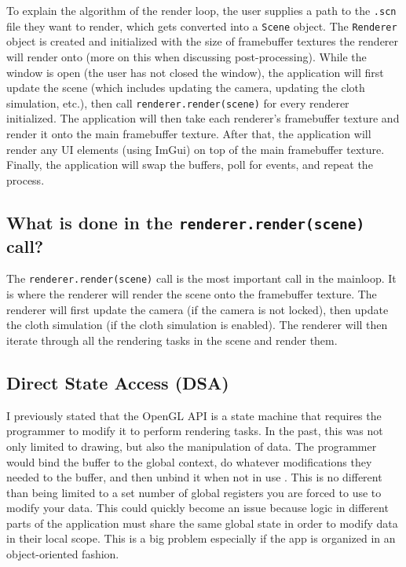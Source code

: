 \documentclass[letterpaper, 10 pt, conference]{ieeeconf}  %
\begin{document}
To explain the algorithm of the render loop, the user supplies a path to the \texttt{.scn} file they want to render, which gets converted into a \texttt{Scene} object. The \texttt{Renderer} object is created and initialized with the size of framebuffer textures the renderer will render onto (more on this when discussing post-processing). While the window is open (the user has not closed the window), the application will first update the scene (which includes updating the camera, updating the cloth simulation, etc.), then call \texttt{renderer.render(scene)} for every renderer initialized. The application will then take each renderer's framebuffer texture and render it onto the main framebuffer texture. After that, the application will render any UI elements (using ImGui) on top of the main framebuffer texture. Finally, the application will swap the buffers, poll for events, and repeat the process.

\subsection{What is done in the \texttt{renderer.render(scene)} call?}
The \texttt{renderer.render(scene)} call is the most important call in the mainloop. It is where the renderer will render the scene onto the framebuffer texture. The renderer will first update the camera (if the camera is not locked), then update the cloth simulation (if the cloth simulation is enabled). The renderer will then iterate through all the rendering tasks in the scene and render them.


\subsection {Direct State Access (DSA)}
I previously stated that the OpenGL API is a state machine that requires the programmer to modify it to perform rendering tasks. In the past, this was not only limited to drawing, but also the manipulation of data. The programmer would bind the buffer to the global context, do whatever modifications they needed to the buffer, and then unbind it when not in use \cite{StephanoDSA}. This is no different than being limited to a set number of global registers you are forced to use to modify your data. This could quickly become an issue because logic in different parts of the application must share the same global state in order to modify data in their local scope. This is a big problem especially if the app is organized in an object-oriented fashion.
\end{document}
